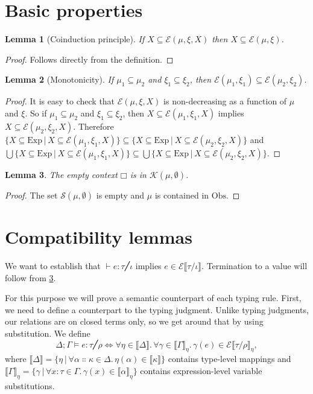 \documentclass[a4paper, 12pt]{report}
\newcommand{\Obs}{\mathrm{Obs}}
\newcommand{\+}{\enspace}
\newtheorem{lemma}{Lemma}
\begin{document}
\section{Basic properties}
\begin{lemma}[Coinduction principle]\label{coinduction}
If $X ⊆ \mathcal{E}(μ,ξ,X)$ then $X ⊆ \mathcal{E}(μ,ξ)$.
\end{lemma}
\begin{proof}
Follows directly from the definition.
\end{proof}

\begin{lemma}[Monotonicity]\label{monotonicity}
If $μ_1 ⊆ μ_2$ and $ξ_1 ⊆ ξ_2$, then $\mathcal{E}(μ_1,ξ_1) ⊆ \mathcal{E}(μ_2,ξ_2)$.
\end{lemma}
\begin{proof}
It is easy to check that $\mathcal{E}(μ,ξ,X)$ is non-decreasing as a function
of $μ$ and $ξ$.
So if $μ_1 ⊆ μ_2$ and $ξ_1 ⊆ ξ_2$, then
$X ⊆ \mathcal{E}(μ_1,ξ_1,X)$ implies $X ⊆ \mathcal{E}(μ_2,ξ_2,X)$.
Therefore
$\{X ⊆ \mathrm{Exp} │ X ⊆ \mathcal{E}(μ_1,ξ_1,X)\}
⊆\{X ⊆ \mathrm{Exp} │ X ⊆ \mathcal{E}(μ_2,ξ_2,X)\}$
and
$\bigcup \{X ⊆ \mathrm{Exp} │ X ⊆ \mathcal{E}(μ_1,ξ_1,X)\}
⊆\bigcup \{X ⊆ \mathrm{Exp} │ X ⊆ \mathcal{E}(μ_2,ξ_2,X)\}$.
\end{proof}

\begin{lemma}\label{empty-context}
	The empty context $□$ is in $\mathcal{K}(μ,∅)$.
\end{lemma}
\begin{proof}
	The set $\mathcal{S}(μ,∅)$ is empty and $μ$ is contained in $\Obs$.
\end{proof}


\section{Compatibility lemmas}
We want to establish that $⊢ e : τ ╱ ι$ implies $e ∈ \mathcal{E}⟦τ/ι⟧$.
Termination to a value will follow from \cref{empty-context}.

For this purpose we will prove a semantic counterpart of each typing rule.
First, we need to define a counterpart to the typing judgment.
Unlike typing judgments, our relations are on closed terms only,
so we get around that by using substitution.
We define
$$Δ;Γ ⊨ e : τ ╱ ρ ⇔ ∀η∈⟦Δ⟧.\, ∀γ∈⟦Γ⟧_η.\,γ(e) ∈ \mathcal{E}⟦τ/ρ⟧_η,$$
where $⟦Δ⟧ = \{ η │ ∀α∷κ∈Δ.\,η(α) ∈ ⟦κ⟧ \}$ contains type-level mappings
and $⟦Γ⟧_η = \{ γ │ ∀x:τ∈Γ.\,γ(x) ∈ ⟦α⟧_η\}$ contains expression-level
variable substitutions.
\end{document}
